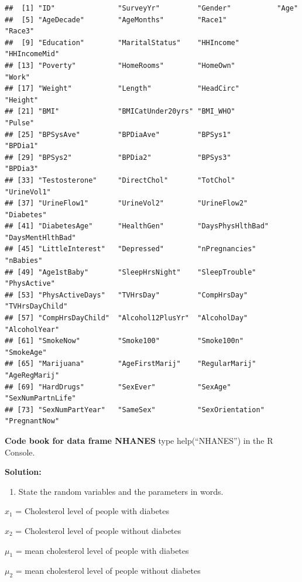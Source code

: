 \documentclass[
]{book}
\providecommand{\tightlist}{%
  \setlength{\itemsep}{0pt}\setlength{\parskip}{0pt}}
\begin{document}
\begin{verbatim}
##  [1] "ID"               "SurveyYr"         "Gender"           "Age"             
##  [5] "AgeDecade"        "AgeMonths"        "Race1"            "Race3"           
##  [9] "Education"        "MaritalStatus"    "HHIncome"         "HHIncomeMid"     
## [13] "Poverty"          "HomeRooms"        "HomeOwn"          "Work"            
## [17] "Weight"           "Length"           "HeadCirc"         "Height"          
## [21] "BMI"              "BMICatUnder20yrs" "BMI_WHO"          "Pulse"           
## [25] "BPSysAve"         "BPDiaAve"         "BPSys1"           "BPDia1"          
## [29] "BPSys2"           "BPDia2"           "BPSys3"           "BPDia3"          
## [33] "Testosterone"     "DirectChol"       "TotChol"          "UrineVol1"       
## [37] "UrineFlow1"       "UrineVol2"        "UrineFlow2"       "Diabetes"        
## [41] "DiabetesAge"      "HealthGen"        "DaysPhysHlthBad"  "DaysMentHlthBad" 
## [45] "LittleInterest"   "Depressed"        "nPregnancies"     "nBabies"         
## [49] "Age1stBaby"       "SleepHrsNight"    "SleepTrouble"     "PhysActive"      
## [53] "PhysActiveDays"   "TVHrsDay"         "CompHrsDay"       "TVHrsDayChild"   
## [57] "CompHrsDayChild"  "Alcohol12PlusYr"  "AlcoholDay"       "AlcoholYear"     
## [61] "SmokeNow"         "Smoke100"         "Smoke100n"        "SmokeAge"        
## [65] "Marijuana"        "AgeFirstMarij"    "RegularMarij"     "AgeRegMarij"     
## [69] "HardDrugs"        "SexEver"          "SexAge"           "SexNumPartnLife" 
## [73] "SexNumPartYear"   "SameSex"          "SexOrientation"   "PregnantNow"
\end{verbatim}

\textbf{Code book for data frame NHANES} type help(``NHANES'') in the R Console.

\textbf{Solution:}

\begin{enumerate}
\def\labelenumi{\arabic{enumi}.}
\tightlist
\item
  State the random variables and the parameters in words.
\end{enumerate}

\(x_1\) = Cholesterol level of people with diabetes

\(x_2\) = Cholesterol level of people without diabetes

\(\mu_1\) = mean cholesterol level of people with diabetes

\(\mu_2\) = mean cholesterol level of people without diabetes
\end{document}
